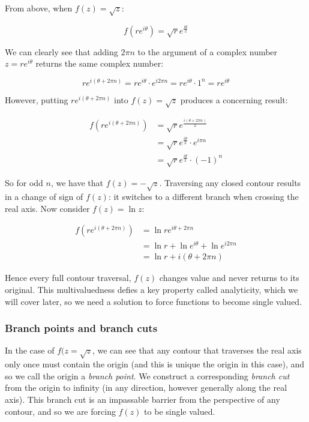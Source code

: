 \documentclass{physics_notes}
\begin{document}
From above, when $f(z) = \sqrt{z}$:

\begin{equation*}
f(re^{i\theta}) = \sqrt{r} e^{\frac{i\theta}{2}}
\end{equation*}

We can clearly see that adding $2\pi n$ to the argument of a complex number $z = re^{i\theta}$ returns the same complex number:

\[re^{i(\theta + 2\pi n)} = re^{i\theta}\cdot e^{i 2\pi n} = re^{i\theta}\cdot 1^n = re^{i\theta} \]

However, putting $re^{i(\theta + 2\pi n)}$ into $f(z) = \sqrt{z}$ produces a concerning result:

\begin{align*}
f(re^{i(\theta + 2\pi n)}) &= \sqrt{r} e^{\frac{i(\theta + 2\pi n)}{2}} \\
&= \sqrt{r} e^{\frac{i\theta}{2}}\cdot e^{i \pi n} \\
&= \sqrt{r} e^{\frac{i\theta}{2}}\cdot (-1)^n 
\end{align*}

So for odd $n$, we have that $f(z) = -\sqrt{z}$. Traversing any closed contour results in a change of sign of $f(z)$: it switches to a different branch when crossing the real axis. Now consider $f(z) = \ln{z}$:

\begin{align*}
f(re^{i(\theta + 2\pi n)}) &= \ln{re^{i\theta + 2\pi n}} \\
&= \ln{r} + \ln{e^{i\theta}} + \ln{e^{i 2\pi n}} \\
&= \ln{r} + i(\theta + 2\pi n)
\end{align*}

Hence every full contour traversal, $f(z)$ changes value and never returns to its original. This multivaluedness defies a key property called analyticity, which we will cover later, so we need a solution to force functions to become single valued. 

\subsubsection*{Branch points and branch cuts }

In the case of $f(z = \sqrt{z}$, we can see that any contour that traverses the real axis only once must contain the origin (and this is unique the origin in this case), and so  we call the origin a \emph{branch point}. We construct a corresponding \emph{branch cut} from the origin to infinity (in any direction, however generally along the real axis). This branch cut is an impassable barrier from the perspective of any contour, and so we are forcing $f(z)$ to be single valued. 
\end{document}
